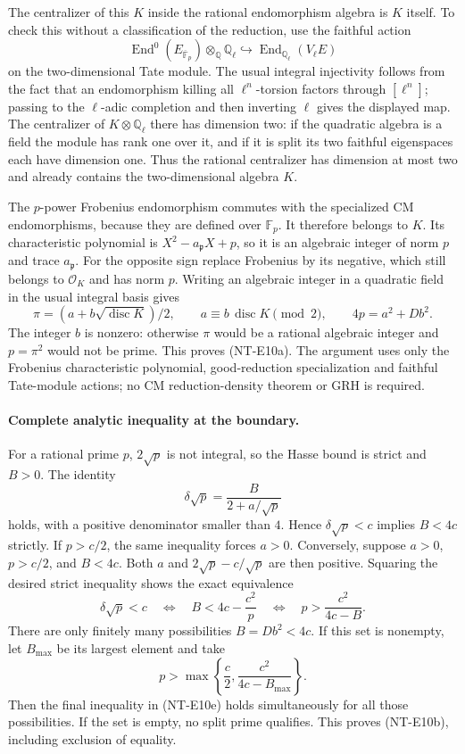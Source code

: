 The centralizer of this $K$ inside the rational endomorphism
algebra is $K$ itself. To check this without a classification of
the reduction, use the faithful action
\[
 \operatorname{End}^0(E_{\overline{\mathbb F}_p})
      \otimes_{\mathbb Q}\mathbb Q_\ell
       \hookrightarrow\operatorname{End}_{\mathbb Q_\ell}(V_\ell E)
\]
on the two-dimensional Tate module. The usual integral
injectivity follows from the fact that an endomorphism killing
all $\ell^n$-torsion factors through $[\ell^n]$; passing to the
$\ell$-adic completion and then inverting $\ell$ gives the displayed
map. The centralizer of
$K\otimes\mathbb Q_\ell$ there has dimension two: if the quadratic
algebra is a field the module has rank one over it, and if it is
split its two faithful eigenspaces each have dimension one.
Thus the rational centralizer has dimension at most two and
already contains the two-dimensional algebra $K$.

The $p$-power Frobenius endomorphism commutes with the specialized
CM endomorphisms, because they are defined over $\mathbb F_p$.
It therefore belongs to $K$. Its characteristic polynomial is
$X^2-a_{\mathfrak p}X+p$, so it is an algebraic integer of norm
$p$ and trace $a_{\mathfrak p}$. For the opposite sign replace
Frobenius by its negative, which still belongs to $\mathcal O_K$
and has norm $p$. Writing an algebraic integer in a quadratic
field in the usual integral basis gives
\[
 \pi=(a+b\sqrt{\operatorname{disc}K})/2,\qquad
 a\equiv b\,\operatorname{disc}K\pmod2,\qquad
 4p=a^2+Db^2.
                                                               \tag{NT-E10c}
\]
The integer $b$ is nonzero: otherwise $\pi$ would be a rational
algebraic integer and $p=\pi^2$ would not be prime.
This proves (NT-E10a). The argument uses only the Frobenius
characteristic polynomial, good-reduction specialization and
faithful Tate-module actions; no CM reduction-density theorem
or GRH is required.

\paragraph{Complete analytic inequality at the boundary.}
For a rational prime $p$, $2\sqrt p$ is not integral, so the Hasse
bound is strict and $B>0$. The identity
\[
 \delta\sqrt p=\frac{B}{2+a/\sqrt p}                    \tag{NT-E10d}
\]
holds, with a positive denominator smaller than $4$. Hence
$\delta\sqrt p<c$ implies $B<4c$ strictly.
If $p>c/2$, the same inequality forces $a>0$.
Conversely, suppose $a>0$, $p>c/2$, and $B<4c$.
Both $a$ and $2\sqrt p-c/\sqrt p$ are then positive.
Squaring the desired strict inequality shows the exact equivalence
\[
 \delta\sqrt p<c
 \quad\Longleftrightarrow\quad
 B<4c-\frac{c^2}{p}
 \quad\Longleftrightarrow\quad
 p>\frac{c^2}{4c-B}.                                   \tag{NT-E10e}
\]
There are only finitely many possibilities $B=Db^2<4c$.
If this set is nonempty, let $B_{\max}$ be its largest element and
take
\[
 p>\max\left\{\frac c2,\frac{c^2}{4c-B_{\max}}\right\}.
                                                               \tag{NT-E10f}
\]
Then the final inequality in (NT-E10e) holds simultaneously for
all those possibilities. If the set is empty, no split prime
qualifies. This proves (NT-E10b), including exclusion of equality.

